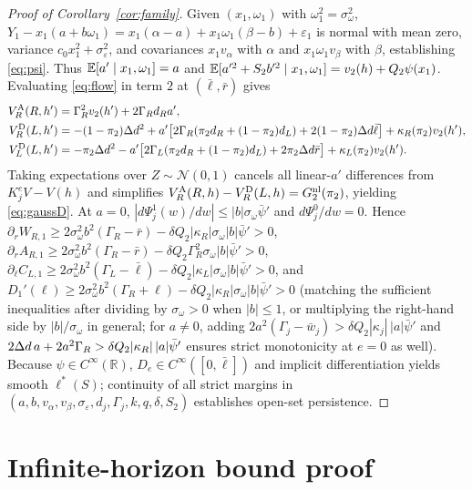 \begin{proof}[Proof of Corollary~\ref{cor:family}]
Given $(x_1,\omega_1)$ with $\omega_1^2=\sigma_\omega^2$, $Y_1-x_1(a+b\omega_1)=x_1(\alpha-a)+x_1\omega_1(\beta-b)+\varepsilon_1$ is normal with mean zero, variance $c_0 x_1^2+\sigma_\varepsilon^2$, and covariances $x_1 v_\alpha$ with $\alpha$ and $x_1\omega_1 v_\beta$ with $\beta$, establishing \eqref{eq:psi}. Thus $\mathbb E[a'\mid x_1,\omega_1]=a$ and $\mathbb E[a'^2+S_2 b'^2\mid x_1,\omega_1]=v_2(h)+Q_2\psi(x_1)$. Evaluating \eqref{eq:flow} in term $2$ at $(\bar\ell,\bar r)$ gives
\begin{align*}
 V_R^\mathrm A(R,h') &= \Gamma_R^2 v_2(h')+2\Gamma_R d_R a',\\
 V_R^\mathrm D(L,h') &= -(1-\pi_2)\Delta d^2+a'\big[2\Gamma_R(\pi_2 d_R+(1-\pi_2)d_L)+2(1-\pi_2)\Delta d\bar\ell\big]+\kappa_R(\pi_2)v_2(h'),\\
 V_L^\mathrm D(L,h') &= -\pi_2\Delta d^2-a'\big[2\Gamma_L(\pi_2 d_R+(1-\pi_2)d_L)+2\pi_2\Delta d\bar r\big]+\kappa_L(\pi_2)v_2(h').
\end{align*}
Taking expectations over $Z\sim\mathcal N(0,1)$ cancels all linear-$a'$ differences from $K_j^e V-V(h)$ and simplifies $V_R^\mathrm A(R,h)-V_R^\mathrm D(L,h)=G_2^{\mathrm{nl}}(\pi_2)$, yielding \eqref{eq:gaussD}. At $a=0$, $|d\Psi_j^1(w)/dw|\le |b|\sigma_\omega\bar\psi'$ and $d\Psi_j^0/dw=0$. Hence $\partial_r W_{R,1}\ge 2\sigma_\omega^2 b^2(\Gamma_R-\bar r)-\delta Q_2|\kappa_R|\sigma_\omega|b|\bar\psi'>0$, $\partial_r A_{R,1}\ge 2\sigma_\omega^2 b^2(\Gamma_R-\bar r)-\delta Q_2\Gamma_R^2\sigma_\omega|b|\bar\psi'>0$, $\partial_\ell C_{L,1}\ge 2\sigma_\omega^2 b^2(\Gamma_L-\bar\ell)-\delta Q_2|\kappa_L|\sigma_\omega|b|\bar\psi'>0$, and $D_1'(\ell)\ge 2\sigma_\omega^2 b^2(\Gamma_R+\ell)-\delta Q_2|\kappa_R|\sigma_\omega|b|\bar\psi'>0$ (matching the sufficient inequalities after dividing by $\sigma_\omega>0$ when $|b|\le 1$, or multiplying the right-hand side by $|b|/\sigma_\omega$ in general; for $a\ne 0$, adding $2a^2(\Gamma_j-\bar w_j)>\delta Q_2|\kappa_j|\,|a|\bar\psi'$ and $2\Delta d\,a+2a^2\Gamma_R>\delta Q_2|\kappa_R|\,|a|\bar\psi'$ ensures strict monotonicity at $e=0$ as well). Because $\psi\in C^\infty(\mathbb R)$, $D_e\in C^\infty([0,\bar\ell])$ and implicit differentiation yields smooth $\ell^*(S)$; continuity of all strict margins in $(a,b,v_\alpha,v_\beta,\sigma_\varepsilon,d_j,\Gamma_j,k,q,\delta,S_2)$ establishes open-set persistence.
\end{proof}

\section{Infinite-horizon bound proof}\label{app:infproof}

